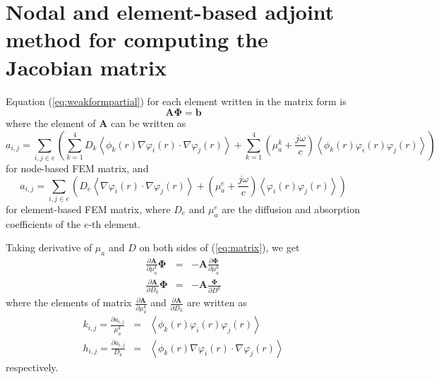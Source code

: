 \documentclass{article}
\begin{document}
\section{Nodal and element-based adjoint method for computing the Jacobian matrix}
Equation (\ref{eq:weakformpartial}) for each element written in the
matrix form is
\begin{equation}
\label{eq:matrix} \mathbf{A}{\boldsymbol\Phi}=\mathbf{b}
\end{equation}
where the element of $\mathbf{A}$ can be written as
\begin{equation}
a_{i,j}=\sum_{i,j\in e}\left(\sum_{k=1}^4D_k\left\langle
\phi_k(r)\nabla\varphi_i(r)\cdot\nabla\varphi_j(r)\right\rangle+\sum_{k=1}^4\left(\mu_{a}^k+\frac{j\omega}{c}\right)\left\langle\phi_k(r)\varphi_i(r)\varphi_j(r)\right\rangle\right)
\end{equation}
for node-based FEM matrix, and 
\begin{equation}
a_{i,j}=\sum_{i,j\in e}\left(D_e\left\langle
\nabla\varphi_i(r)\cdot\nabla\varphi_j(r)\right\rangle+\left(\mu_{a}^{e}+\frac{j\omega}{c}\right)\left\langle\varphi_i(r)\varphi_j(r)\right\rangle\right)
\end{equation}
for element-based FEM matrix, where $D_e$ and $\mu_a^{e}$ are the diffusion and absorption coefficients 
of the $e$-th element.

Taking derivative of $\mu_a$ and $D$ on both sides of
(\ref{eq:matrix}), we get
\begin{eqnarray}
\frac{\partial \mathbf{A}}{\partial
\mu_a^k}{\boldsymbol\Phi}&=&-\mathbf{A}\frac{\partial {\boldsymbol\Phi}}{\partial \mu_a^k}\\
\frac{\partial \mathbf{A}}{\partial
D_k}{\boldsymbol\Phi}&=&-\mathbf{A}\frac{\boldsymbol\Phi}{\partial
D^k}
\end{eqnarray}
where the elements of matrix $\frac{\partial \mathbf{A}}{\partial
\mu_a^k}$ and $\frac{\partial \mathbf{A}}{\partial D_k}$ are
written as
\begin{eqnarray}
k_{i,j}=\frac{\partial
a_{i,j}}{\mu_a^k}&=&\left\langle\phi_k(r)\varphi_i(r)\varphi_j(r)\right\rangle\\
h_{i,j}=\frac{\partial a_{i,j}}{D_k}&=&\left\langle
\phi_k(r)\nabla\varphi_i(r)\cdot\nabla\varphi_j(r)\right\rangle
\end{eqnarray}
respectively.
\end{document}
